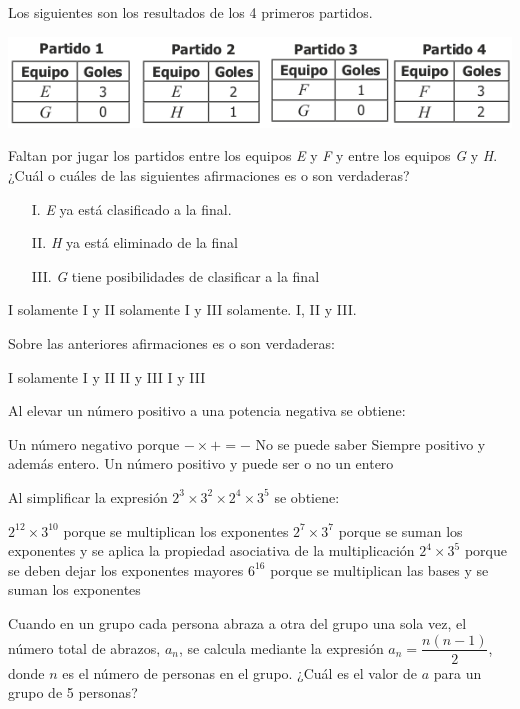 \documentclass[10pt,letterpaper,addpoints]{exam}
\begin{document}
\begin{questions}
\begin{multicols}{2}
{Los siguientes son los resultados de los 4 primeros partidos.
\begin{center}
\includegraphics[scale=.4]{Images/partidos.png}
\end{center}}
\question Faltan por jugar los partidos entre los equipos \textit{E} y \textit{F} y entre los equipos \textit{G} y \textit{H}. ¿Cuál o cuáles de las siguientes afirmaciones es o son verdaderas?
\begin{itemize}
  \item[I.] \textit{E} ya está clasificado a la final.
  \item[II.] \textit{H} ya está eliminado de la final
  \item[III.] \textit{G} tiene posibilidades de clasificar a la final 
\end{itemize}
\begin{choices}
    \choice I solamente
    \CorrectChoice I y II solamente
    \choice I y III solamente.
    \choice I, II y III.
\end{choices}
\question Sobre las anteriores afirmaciones es o son verdaderas:
\begin{choices}
    \choice I solamente
    \choice I y II
    \CorrectChoice II y III
    \choice I y III
\end{choices}
\question Al elevar un número positivo a una potencia negativa se obtiene:
\begin{choices}
    \choice Un número negativo porque $ -\times+=- $
    \choice No se puede saber
    \choice Siempre positivo y además entero.
    \CorrectChoice Un número positivo y puede ser o no un entero 
\end{choices}
  \question Al simplificar la expresión $ 2^3\times3^2\times2^4\times3^5 $ se obtiene:
\begin{choices}
    \choice $ 2^{12}\times3^{10} $ porque se multiplican los exponentes
    \CorrectChoice $ 2^7\times3^7 $ porque se suman los exponentes y se aplica la propiedad asociativa de la multiplicación
    \choice $ 2^4\times3^5 $ porque se deben dejar los exponentes mayores
    \choice $ 6^{16} $ porque se multiplican las bases y se suman los exponentes
\end{choices}
\question Cuando en un grupo cada persona abraza a otra del grupo una sola vez, el número total de abrazos, $a_{n}$, se calcula mediante la expresión $a_{n}=\dfrac{n(n-1)}{2}$, donde $n$ es el número de personas en el grupo. ¿Cuál es el valor de $a$ para un grupo de 5 personas?


\end{multicols}
\end{questions}
\end{document}
